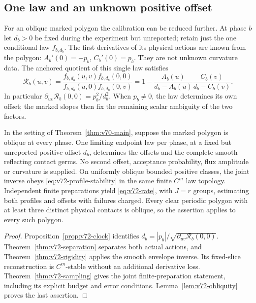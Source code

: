 \subsection{One law and an unknown positive offset}

For an oblique marked polygon the calibration can be reduced further.
At phase $b$ let $d_b>0$ be fixed during the experiment but unreported;
retain just the one conditional law $f_{b,d_b}$.  The first derivatives
of its physical actions are known from the polygon:
$A_b'(0)=-p_b$, $C_b'(0)=p_b$.  They are not unknown curvature data.
The anchored quotient of this single law satisfies
\[
 \mathcal R_b(u,v)=\frac{f_{b,d_b}(u,v)f_{b,d_b}(0,0)}
 {f_{b,d_b}(u,0)f_{b,d_b}(0,v)}
 =1-\frac{A_b(u)}{d_b-A_b(u)}\frac{C_b(v)}{d_b-C_b(v)}.
\]
In particular $\partial_{uv}\mathcal R_b(0,0)=p_b^2/d_b^2$.
When $p_b\ne0$, the law determines its own offset; the marked slopes
then fix the remaining scalar ambiguity of the two factors.

\begin{theorem}
\label{thm:v72-main}
In the setting of Theorem~\ref{thm:v70-main}, suppose the marked
polygon is oblique at every phase.  One limiting endpoint law per
phase, at a fixed but unreported positive offset $d_b$, determines the
offsets and the complete smooth reflecting contact germs.  No second
offset, acceptance probability, flux amplitude or curvature is supplied.
On uniformly oblique bounded positive classes, the joint inverse obeys
\eqref{eq:v72-profile-stability} in the same finite $C^m$ law topology.
Independent finite preparations yield \eqref{eq:v72-rate}, with
$J=r$ groups, estimating both profiles and offsets with failures charged.
Every clear periodic polygon with at least three distinct physical
contacts is oblique, so the assertion applies to every such polygon.
\end{theorem}
\begin{proof}
Proposition~\ref{prop:v72-clock} identifies
$d_b=|p_b|/\sqrt{\partial_{uv}\mathcal R_b(0,0)}$.
Theorem~\ref{thm:v72-separation} separates both actual actions, and
Theorem~\ref{thm:v72-rigidity} applies the smooth envelope inverse.
Its fixed-slice reconstruction is $C^m$-stable without an additional
derivative loss.  Theorem~\ref{thm:v72-sampling} gives the joint
finite-preparation statement, including its explicit budget and error
conditions.  Lemma~\ref{lem:v72-obliquity} proves the last assertion.
\end{proof}

